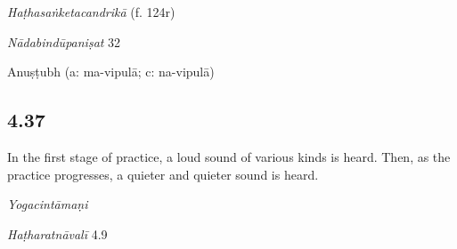\begin{ekdosis}
\begin{testimonia}[hp04_036]
\emph{Haṭhasaṅketacandrikā} (f. 124r)
\begin{versinnote}
\end{versinnote}

\emph{Nādabindūpaniṣat} 32
\begin{versinnote}
\end{versinnote}
\end{testimonia}


\begin{metre}[hp04_036]
Anuṣṭubh (a: ma-vipulā; c: na-vipulā)
\end{metre}

\subsection*{4.37}
\begin{translation}[hp04_037]
In the first stage of practice, a loud sound of various kinds is heard. Then, as the practice progresses, a quieter and quieter sound is heard.
\end{translation}


\begin{testimonia}[hp04_037]
\emph{Yogacintāmaṇi}
\begin{versinnote}
\end{versinnote}

\emph{Haṭharatnāvalī} 4.9
\begin{versinnote}
\end{versinnote}


\end{testimonia}
\end{ekdosis}
